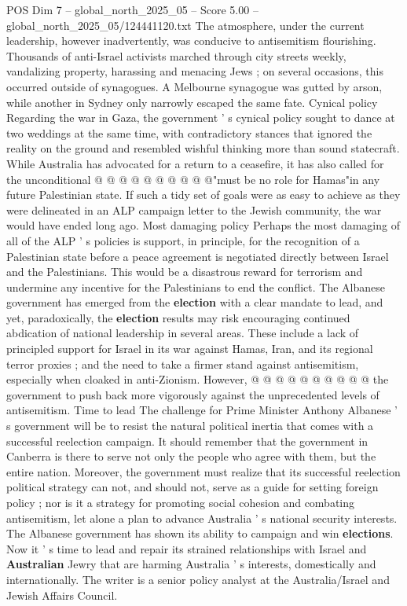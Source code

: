 \begin{textsample}{POS Dim 7 – global\_north\_2025\_05 – Score 5.00 – global\_north\_2025\_05/124441120.txt}
The atmosphere, under the current leadership, however inadvertently, was conducive to antisemitism flourishing.
Thousands of anti-Israel activists marched through city streets weekly, vandalizing property, harassing and menacing Jews ; on several occasions, this occurred outside of synagogues.
A Melbourne synagogue was gutted by arson, while another in Sydney only narrowly escaped the same fate.
Cynical policy Regarding the war in Gaza, the government ' s cynical policy sought to dance at two weddings at the same time, with contradictory stances that ignored the reality on the ground and resembled wishful thinking more than sound statecraft.
While Australia has advocated for a return to a ceasefire, it has also called for the unconditional @ @ @ @ @ @ @ @ @ @"must be no role for Hamas"in any future Palestinian state.
If such a tidy set of goals were as easy to achieve as they were delineated in an ALP campaign letter to the Jewish community, the war would have ended long ago.
Most damaging policy Perhaps the most damaging of all of the ALP ' s policies is support, in principle, for the recognition of a Palestinian state before a peace agreement is negotiated directly between Israel and the Palestinians.
This would be a disastrous reward for terrorism and undermine any incentive for the Palestinians to end the conflict.
The Albanese government has emerged from the \textbf{election} with a clear mandate to lead, and yet, paradoxically, the \textbf{election} results may risk encouraging continued abdication of national leadership in several areas.
These include a lack of principled support for Israel in its war against Hamas, Iran, and its regional terror proxies ; and the need to take a firmer stand against antisemitism, especially when cloaked in anti-Zionism.
However, @ @ @ @ @ @ @ @ @ @ the government to push back more vigorously against the unprecedented levels of antisemitism.
Time to lead The challenge for Prime Minister Anthony Albanese ' s government will be to resist the natural political inertia that comes with a successful reelection campaign.
It should remember that the government in Canberra is there to serve not only the people who agree with them, but the entire nation.
Moreover, the government must realize that its successful reelection political strategy can not, and should not, serve as a guide for setting foreign policy ; nor is it a strategy for promoting social cohesion and combating antisemitism, let alone a plan to advance Australia ' s national security interests.
The Albanese government has shown its ability to campaign and win \textbf{elections}.
Now it ' s time to lead and repair its strained relationships with Israel and \textbf{Australian} Jewry that are harming Australia ' s interests, domestically and internationally.
The writer is a senior policy analyst at the Australia/Israel and Jewish Affairs Council.

\end{textsample}
